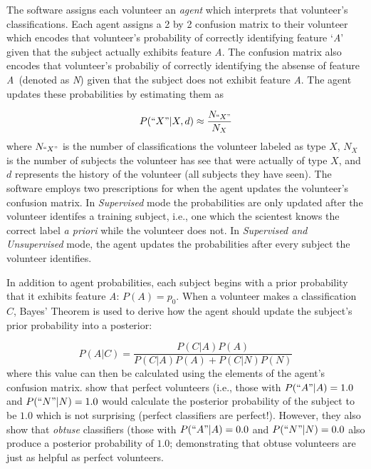 \documentclass[twocolumn]{aastex6}
\newcommand{\A}{\textit{A}}
\newcommand{\N}{\textit{N}}
\begin{document}
The software assigns each volunteer an \textit{agent} which interprets that volunteer's 
classifications. Each agent assigns a 2 by 2 confusion matrix to their volunteer which encodes
that volunteer's probability of correctly identifying feature `\A'  given that the subject 
actually exhibits feature \A. The confusion matrix also encodes that volunteer's 
probabiliy of correctly identifying
the absense of feature \A~(denoted as \N) given that the subject does not exhibit 
feature \A. The agent updates these probabilities by estimating them as 

\begin{equation}
P(``X" | X, d) \approx \frac{N_{``X"}}{N_{X}}
\end{equation}
where $N_{``X"}$ is the number of classifications the volunteer labeled as type $X$, 
$N_X$ is the number of subjects the volunteer has see that were actually of type $X$,
and $d$ represents the history of the volunteer (all subjects they have seen). 
The software employs two prescriptions for when the 
agent updates the volunteer's confusion matrix. In \textit{Supervised} mode the 
probabilities are only updated after the volunteer identifes a training subject, 
i.e., one which the scientest knows the correct label \textit{a priori} while the
volunteer does not. In \textit{Supervised and Unsupervised} mode, the agent
updates the probabilities after every subject the volunteer identifies.  

In addition to agent probabilities, each subject begins with a prior probability 
that it exhibits feature \A: $P(A) = p_0$. 
When a volunteer makes a classification $C$, Bayes' Theorem is used to derive how 
the agent should update the subject's prior probability into a posterior: 

\begin{equation}
P(A|C) = \frac{ P(C|A) P(A) }{P(C|A) P(A) + P(C|N) P(N)}
\end{equation}
where this value can then be calculated using the elements of the agent's 
confusion matrix. \cite{Marshall2016} show that perfect volunteers (i.e., those 
with $P(``A"| A) = 1.0$ and $P(``N" | N) = 1.0$ would calculate the posterior
probability of the subject to be $1.0$ which is not surprising (perfect classifiers 
are perfect!). However, they also show that \textit{obtuse} classifiers (those with 
$P(``A" | A) = 0.0$ and $P(``N" | N) = 0.0$ also produce a posterior probability 
of $1.0$; demonstrating that obtuse volunteers are just as helpful as perfect volunteers.
\end{document}
